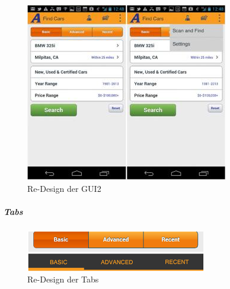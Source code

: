 \begin{figure}[h]
 \centering
 \includegraphics[height=0.40\textheight]{img/Design4.png}
 \caption{Re-Design der GUI2}
 \label{fig:design4}
\end{figure}

\subparagraph{Tabs}
\label{sub:tabs}

\begin{figure}[h]
 \centering
 \includegraphics[height=0.40\textheight]{img/tabs.png}
 \caption{Re-Design der Tabs}
 \label{fig:tabs}
\end{figure}
